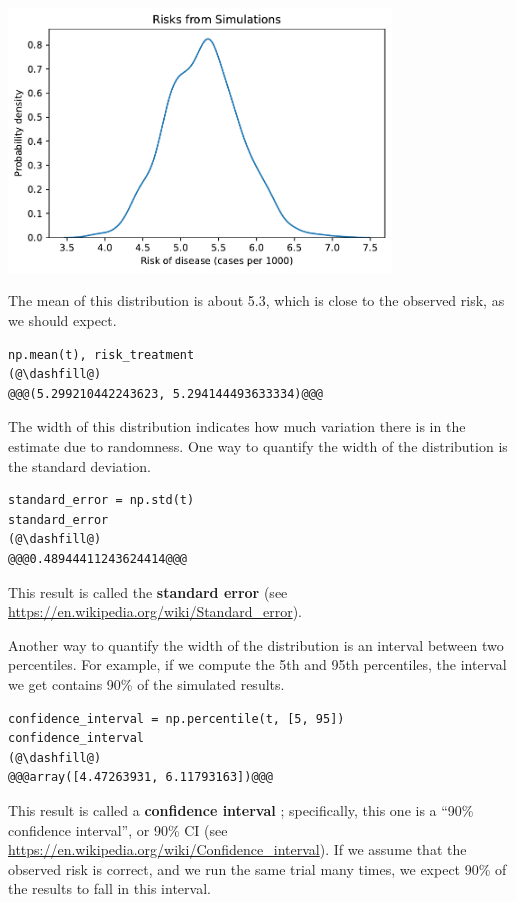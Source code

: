 \begin{center}
\includegraphics[width=4in]{chapters/11_resampling_files/11_resampling_29_0.pdf}
\end{center}

The mean of this distribution is about 5.3, which is close to the
observed risk, as we should expect.

\begin{lstlisting}[]
np.mean(t), risk_treatment
(@\dashfill@)
@@@(5.299210442243623, 5.294144493633334)@@@
\end{lstlisting}

The width of this distribution indicates how much variation there is in
the estimate due to randomness. One way to quantify the width of the
distribution is the standard deviation.

\begin{lstlisting}[]
standard_error = np.std(t)
standard_error
(@\dashfill@)
@@@0.48944411243624414@@@
\end{lstlisting}

This result is called the \textbf{standard error} (see
\url{https://en.wikipedia.org/wiki/Standard_error}).

Another way to quantify the width of the distribution is an interval
between two percentiles. For example, if we compute the 5th and 95th
percentiles, the interval we get contains 90\% of the simulated results.

\begin{lstlisting}[]
confidence_interval = np.percentile(t, [5, 95])
confidence_interval
(@\dashfill@)
@@@array([4.47263931, 6.11793163])@@@
\end{lstlisting}

This result is called a \textbf{confidence interval} ; specifically,
this one is a ``90\% confidence interval'', or 90\% CI (see
\url{https://en.wikipedia.org/wiki/Confidence_interval}). If we assume
that the observed risk is correct, and we run the same trial many times,
we expect 90\% of the results to fall in this interval.

